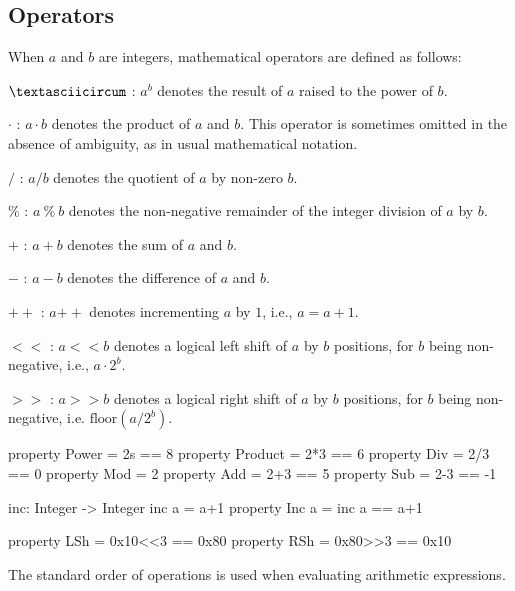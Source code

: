\subsection{Operators}
When $a$ and $b$ are integers, mathematical operators are defined as
follows:
\begin{description}
 \item $\textasciicircum$ : $a ^ b$ denotes the result of $a$ raised to the power of $b$.
 \item $\cdot$ : $a \cdot b$ denotes the product of $a$ and $b$.  This operator is
      sometimes omitted in the absence of ambiguity, as in usual
      mathematical notation.

 \item $/$ : $a / b$ denotes the quotient of $a$ by non-zero $b$.

 \item $\%$ : $a\ \%\ b$ denotes the non-negative remainder of the integer
      division of $a$ by $b$.

 \item $+$ : $a + b$ denotes the sum of $a$ and $b$.

 \item $-$ : $a - b$ denotes the difference of $a$ and $b$.

 \item $++$ : $a{++}$ denotes incrementing $a$ by $1$, i.e., $a = a + 1$.

 \item $<<$ : $a << b$ denotes a logical left shift of $a$ by $b$ positions, for $b$  being non-negative,
 i.e., $a \cdot 2^b$.

 \item $>>$ : $a >> b$ denotes a logical right shift of $a$ by $b$ positions, for $b$ being non-negative,
 i.e. $\textrm{floor}(a / 2^b)$.
\end{description}

\begin{code}
  property Power = 2^^3 == 8
  property Product = 2*3 == 6
  property Div = 2/3 == 0
  property Mod = 2%
  property Add = 2+3 == 5
  property Sub = 2-3 == -1

  inc: Integer -> Integer
  inc a = a+1
  property Inc a = inc a == a+1

  property LSh = 0x10<<3 == 0x80
  property RSh = 0x80>>3 == 0x10
\end{code}

   The standard order of operations is used when evaluating arithmetic
   expressions.
   \\

